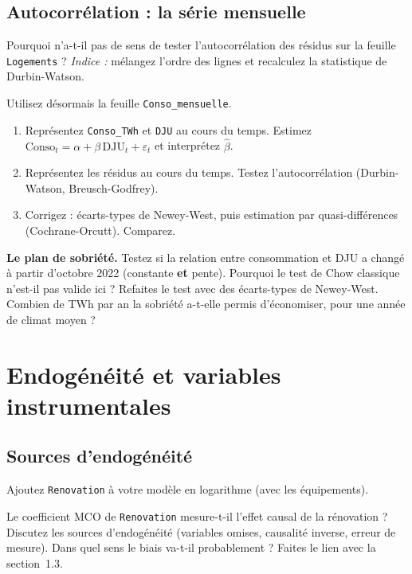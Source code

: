 \documentclass[11pt,a4paper]{article}
\newcommand{\var}[1]{\texttt{#1}}
\begin{document}
\subsection{Autocorrélation : la série mensuelle}

\begin{question}
Pourquoi n'a-t-il pas de sens de tester l'autocorrélation des résidus sur la feuille \var{Logements} ? \textit{Indice :} mélangez l'ordre des lignes et recalculez la statistique de Durbin-Watson.
\end{question}

Utilisez désormais la feuille \var{Conso\_mensuelle}.
\begin{enumerate}
  \item Représentez \var{Conso\_TWh} et \var{DJU} au cours du temps. Estimez $\text{Conso}_t = \alpha + \beta\,\text{DJU}_t + \varepsilon_t$ et interprétez $\hat\beta$.
  \item Représentez les résidus au cours du temps. Testez l'autocorrélation (Durbin-Watson, Breusch-Godfrey).
  \item Corrigez : écarts-types de Newey-West, puis estimation par quasi-différences (Cochrane-Orcutt). Comparez.
\end{enumerate}

\begin{afaire}
\textbf{Le plan de sobriété.} Testez si la relation entre consommation et DJU a changé à partir d'octobre 2022 (constante \textbf{et} pente). Pourquoi le test de Chow classique n'est-il pas valide ici ? Refaites le test avec des écarts-types de Newey-West. Combien de TWh par an la sobriété a-t-elle permis d'économiser, pour une année de climat moyen ?
\end{afaire}

\section{Endogénéité et variables instrumentales}\label{sec:endo}

\subsection{Sources d'endogénéité}
Ajoutez \var{Renovation} à votre modèle en logarithme (avec les équipements).

\begin{question}
Le coefficient MCO de \var{Renovation} mesure-t-il l'effet causal de la rénovation ? Discutez les sources d'endogénéité (variables omises, causalité inverse, erreur de mesure). Dans quel sens le biais va-t-il probablement ? Faites le lien avec la section~1.3.
\end{question}
\end{document}
